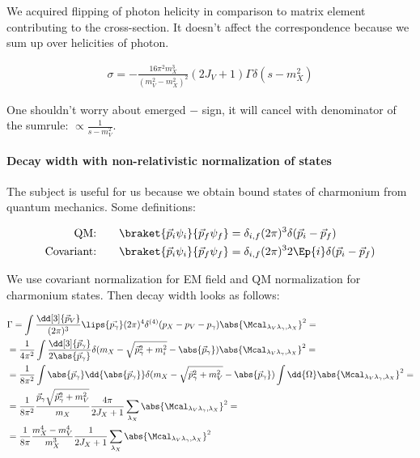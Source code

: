 We acquired flipping of photon helicity in comparison to matrix element contributing to the cross-section. It doesn't affect the correspondence because we sum up over helicities of photon.

\begin{align} \label{eq:app:crsc-dw-subthr}
    \sigma = -\frac{16 \pi^2 m_X^3}{(m_V^2 - m_X^2)^2} (2J_V + 1) \Gamma \delta(s - m_X^2)
\end{align}

One shouldn't worry about emerged $-$ sign, it will cancel with denominator of the sumrule: $\propto \frac{1}{s - m_V^2}$.

\paragraph{Decay width with non-relativistic normalization of states} \label{par:app:dw-nr}
The subject is useful for us because we obtain bound states of charmonium from quantum mechanics. Some definitions:

\begin{align}
    \text{QM:}\qquad &\braket{\vec{p}_i \psi_i}{\vec{p}_f \psi_f} = \delta_{i, f} (2\pi)^3 \delta(\vec{p}_i - \vec{p}_f) \\
    \text{Covariant:}\qquad &\braket{\vec{p}_i \psi_i}{\vec{p}_f \psi_f} = \delta_{i, f} (2\pi)^3 2 \Ep{i} \delta(\vec{p}_i - \vec{p}_f)
\end{align}

We use covariant normalization for EM field and QM normalization for charmonium states. Then decay width looks as follows:

\begin{align}
    &\Gamma = \int \frac{\dd[3]{\vec{p}_V}}{(2\pi)^3} \lips{\vec{p_\gamma}}  (2\pi)^4 \delta^{(4)}(p_X - p_V - p_\gamma) \abs{\Mcal_{\lambda_V \lambda_\gamma, \lambda_X}}^2 = \\
    &= \frac{1}{4 \pi^2} \int \frac{\dd[3]{\vec{p}_\gamma}}{2 \abs{\vec{p}_\gamma}} \delta(m_X - \sqrt{\vec{p}_\gamma^2 + m_i^2} - \abs{\vec{p}_\gamma}) \abs{\Mcal_{\lambda_V \lambda_\gamma, \lambda_X}}^2 = \\
    &= \frac{1}{8\pi^2} \int \abs{\vec{p}_\gamma} \dd{\abs{\vec{p}_\gamma}} \delta(m_X - \sqrt{\vec{p}_\gamma^2 + m_V^2} - \abs{\vec{p}_\gamma}) \int \dd{\Omega}\abs{\Mcal_{\lambda_V \lambda_\gamma, \lambda_X}}^2 = \\
    &= \frac{1}{8 \pi^2} \frac{\vec{p}_\gamma \sqrt{\vec{p}_\gamma^2 + m_V^2}}{m_X} \frac{4 \pi}{2J_X + 1} \sum_{\lambda_X} \abs{\Mcal_{\lambda_V \lambda_\gamma, \lambda_X}}^2 = \\
    &= \frac{1}{8 \pi} \frac{m_X^4 - m_V^4}{m_X^3} \frac{1}{2J_X + 1} \sum_{\lambda_X} \abs{\Mcal_{\lambda_V \lambda_\gamma, \lambda_X}}^2
\end{align}
